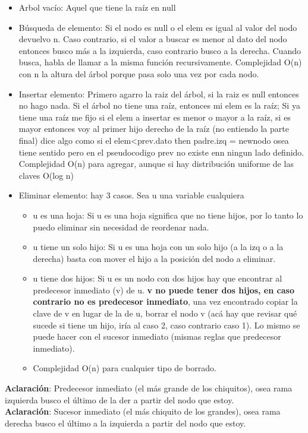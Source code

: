\documentclass[10pt,a4paper]{article}
\begin{document}
\begin{itemize}
    \item Arbol vacío: Aquel que tiene la raíz en null
    \item Búsqueda de elemento: Si el nodo es null o el elem es igual al valor del nodo devuelvo n. Caso contrario, si el valor a buscar es menor al dato del nodo entonces busco más a la izquierda, caso contrario busco a la derecha. Cuando busca, habla de llamar a la misma función recursivamente. Complejidad O(n) con n la altura del árbol porque pasa solo una vez por cada nodo.
    \item Insertar elemento: Primero agarro la raiz del árbol, si la raiz es null entonces no hago nada. Si el árbol no tiene una raíz, entonces mi elem es la raíz; Si ya tiene una raíz me fijo si el elem a insertar es menor o mayor a la raíz, si es mayor entonces voy al primer hijo derecho de la raíz (no entiendo la parte final) dice algo como si el elem<prev.dato then padre.izq = newnodo osea tiene sentido pero en el pseudocodigo prev no existe enn ningun lado definido. Complejidad O(n) para agregar, aunque si hay distribución uniforme de las claves O(log n)
    \item Eliminar elemento: hay 3 casos. Sea u una variable cualquiera
    \begin{itemize}
        \item u es una hoja: Si u es una hoja significa que no tiene hijos, por lo tanto lo puedo eliminar sin necesidad de reordenar nada.
        \item u tiene un solo hijo: Si u es una hoja con un solo hijo (a la izq o a la derecha) basta con mover el hijo a la posición del nodo a eliminar.
        \item u tiene dos hijos: Si u es un nodo con dos hijos hay que encontrar al predecesor inmediato (v) de u. \textbf{v no puede tener dos hijos, en caso contrario no es predecesor inmediato}, una vez encontrado copiar la clave de v en lugar de la de u, borrar el nodo v (acá hay que revisar qué sucede si tiene un hijo, iría al caso 2, caso contrario caso 1). Lo mismo se puede hacer con el sucesor inmediato (mismas reglas que predecesor inmediato). 
        \item Complejidad O(n) para cualquier tipo de borrado.
    \end{itemize}
\end{itemize}
\textbf{Aclaración}: Predecesor inmediato (el más grande de los chiquitos), osea rama izquierda busco el último de la der a partir del nodo que estoy. \\ 
\textbf{Aclaración}: Sucesor inmediato (el más chiquito de los grandes), osea rama derecha busco el último a la izquierda a partir del nodo que estoy. \\
\end{document}
